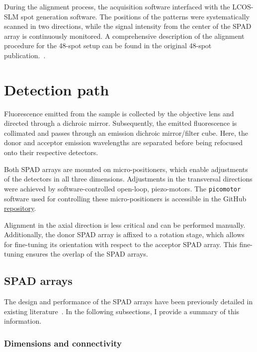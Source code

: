 During the alignment process, the acquisition software interfaced with the \ac{LCOS-SLM} spot generation software. 
The positions of the patterns were systematically scanned in two directions, while the signal intensity from the center of the \ac{SPAD} array is continuously monitored. 
A comprehensive description of the alignment procedure for the 48-spot setup can be found in the original 48-spot publication.~\cite{ingargiola_JCP_2018}.

\section{Detection path}
\label{sec:detection_path}

Fluorescence emitted from the sample is collected by the objective lens and directed through a dichroic mirror. 
Subsequently, the emitted fluorescence is collimated and passes through an emission dichroic mirror/filter cube. 
Here, the donor and acceptor emission wavelengths are separated before being refocused onto their respective detectors.

Both \ac{SPAD} arrays are mounted on micro-positioners, which enable adjustments of the detectors in all three dimensions. 
Adjustments in the transversal directions were achieved by software-controlled open-loop, piezo-motors. 
The \texttt{picomotor} software used for controlling these micro-positioners is accessible in the GitHub \href{https://github.com/tritemio/picomotor}{repository}.

Alignment in the axial direction is less critical and can be performed manually. 
Additionally, the donor \ac{SPAD} array is affixed to a rotation stage, which allows for fine-tuning its orientation with respect to the acceptor \ac{SPAD} array. 
This fine-tuning ensures the overlap of the \ac{SPAD} arrays.

\subsection{SPAD arrays}
\label{sec:SPADs}

The design and performance of the \ac{SPAD} arrays have been previously detailed in existing literature~\cite{gulinatti_SPIE_2013, ingargiola_JCP_2018}. 
In the following subsections, I provide a summary of this information.

\subsubsection{Dimensions and connectivity}

